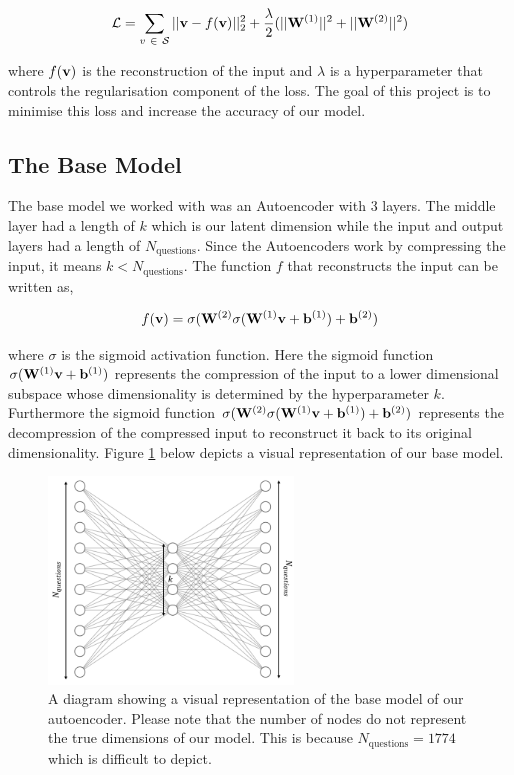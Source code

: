 \documentclass{article}
\begin{document}
\begin{equation}
    \mathcal{L}= \sum_{v\ \in\ \mathcal{S}}||\bold{v}-f(\bold{v})||_2^2 + \dfrac{\lambda}{2}(||\bold{W}^{(1)}||^2+ ||\bold{W}^{(2)}||^2)
    \label{eqn:loss}
\end{equation}

where $f(\bold{v})$ is the reconstruction of the input and $\lambda$ is a hyperparameter that controls the regularisation component of the loss. The goal of this project is to minimise this loss and increase the accuracy of our model. 

\subsection*{The Base Model}
The base model we worked with was an Autoencoder with 3 layers. The middle layer had a length of $k$ which is our latent dimension while the input and output layers had a length of $N_{\text{questions}}$. Since the Autoencoders work by compressing the input, it means $k< N_{\text{questions}}$. The function $f$ that reconstructs the input can be written as,

\begin{equation}
    f(\bold{v})= \sigma(\bold{W}^{(2)}\sigma(\bold{W}^{(1)}\bold{v}+\bold{b}^{(1)})+\bold{b}^{(2)})
    \label{eqn:reconstruction}
\end{equation}

where $\sigma$ is the sigmoid activation function. Here the sigmoid function $\sigma(\bold{W}^{(1)}\bold{v}+\bold{b}^{(1)})$ represents the compression of the input to a lower dimensional subspace whose dimensionality is determined by the hyperparameter $k$. Furthermore the sigmoid function $\sigma(\bold{W}^{(2)}\sigma(\bold{W}^{(1)}\bold{v}+\bold{b}^{(1)})+\bold{b}^{(2)})$ represents the decompression of the compressed input to reconstruct it back to its original dimensionality. Figure \ref{fig:autoencoder} below depicts a visual representation of our base model.

\begin{figure}[H]
    \centering
    \includegraphics[width=6.5cm]{autoencoder.png}
    \caption{A diagram showing a visual representation of the base model of our autoencoder. Please note that the number of nodes do not represent the true dimensions of our model. This is because $N_{\text{questions}}=1774$ which is difficult to depict.}
    \label{fig:autoencoder}
\end{figure}
\end{document}
